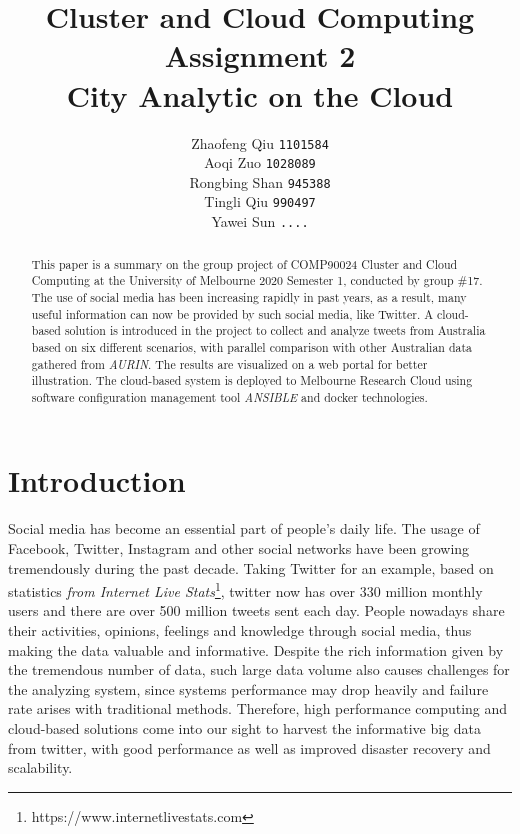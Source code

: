 \documentclass{article}
\title{Cluster and Cloud Computing Assignment 2
		\\ City Analytic on the Cloud} %
\author{ Zhaofeng Qiu \texttt{1101584}
        \\ Aoqi Zuo \texttt{1028089}
        \\Rongbing Shan \texttt{945388}
        \\Tingli Qiu \texttt{990497}
        \\Yawei Sun \texttt{....}}%
\begin{document}
\maketitle %

\begin{abstract}
This paper is a summary on the group project of COMP90024 Cluster and Cloud Computing at the University of Melbourne 2020 Semester 1, conducted by group \#17. The use of social media has been increasing rapidly in past years, as a result, many useful information can now be provided by such social media, like Twitter. A cloud-based solution is introduced in the project to collect and analyze tweets from Australia based on 
six different scenarios, with parallel comparison with other Australian data gathered from \textit{AURIN}. The results are visualized on a web portal for better illustration. The cloud-based system is deployed to Melbourne Research Cloud using software configuration management tool \textit{ANSIBLE} and docker technologies. 
\end{abstract}

\section{Introduction}
Social media has become an essential part of people’s daily life. The usage of Facebook, Twitter, Instagram and other social networks have been growing tremendously during the past decade. Taking Twitter for an example, based on statistics \textit{from Internet Live Stats}\footnote{https://www.internetlivestats.com}, twitter now has over 330 million monthly users and there are over 500 million tweets sent each day. People nowadays share their activities, opinions, feelings and knowledge through social media, thus making the data valuable and informative. Despite the rich information given by the tremendous number of data, such large data volume also causes challenges for the analyzing system, since systems performance may drop heavily and failure rate arises with traditional methods. Therefore, high performance computing and cloud-based solutions come into our sight to harvest the informative big data from twitter, with good performance as well as improved disaster recovery and scalability.
\end{document}
